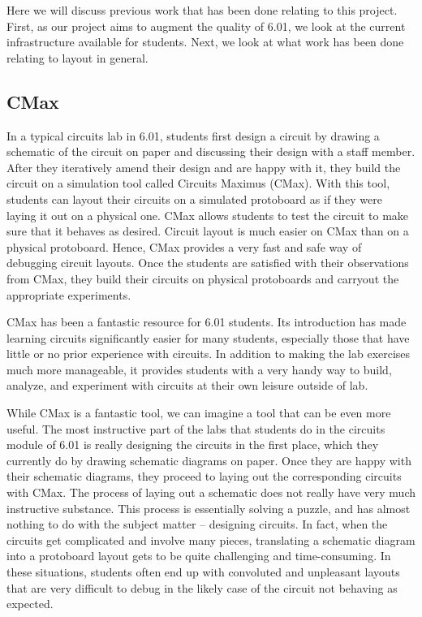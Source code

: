Here we will discuss previous work that has been done relating to this project.
First, as our project aims to augment the quality of 6.01, we look at the
current infrastructure available for students. Next, we look at what work has
been done relating to layout in general.

\subsection{CMax}

In a typical circuits lab in 6.01, students first design a circuit by drawing a
schematic of the circuit on paper and discussing their design with a staff
member. After they iteratively amend their design and are happy with it, they
build the circuit on a simulation tool called Circuits Maximus (CMax). With this
tool, students can layout their circuits on a simulated protoboard as if they
were laying it out on a physical one. CMax allows students to test the circuit
to make sure that it behaves as desired. Circuit layout is much easier on CMax
than on a physical protoboard. Hence, CMax provides a very fast and safe way of
debugging circuit layouts. Once the students are satisfied with their
observations from CMax, they build their circuits on physical protoboards and
carryout the appropriate experiments.

CMax has been a fantastic resource for 6.01 students. Its introduction has made
learning circuits significantly easier for many students, especially those that
have little or no prior experience with circuits. In addition to making the lab
exercises much more manageable, it provides students with a very handy way to
build, analyze, and experiment with circuits at their own leisure outside of lab.

While CMax is a fantastic tool, we can imagine a tool that can be even more
useful. The most instructive part of the labs that students do in the circuits
module of 6.01 is really designing the circuits in the first place, which they
currently do by drawing schematic diagrams on paper. Once they are happy with
their schematic diagrams, they proceed to laying out the corresponding circuits
with CMax. The process of laying out a schematic does not really have very much
instructive substance. This process is essentially solving a puzzle, and has
almost nothing to do with the subject matter -- designing circuits. In fact,
when the circuits get complicated and involve many pieces, translating a
schematic diagram into a protoboard layout gets to be quite challenging and
time-consuming. In these situations, students often end up with convoluted and
unpleasant layouts that are very difficult to debug in the likely case of the
circuit not behaving as expected.

